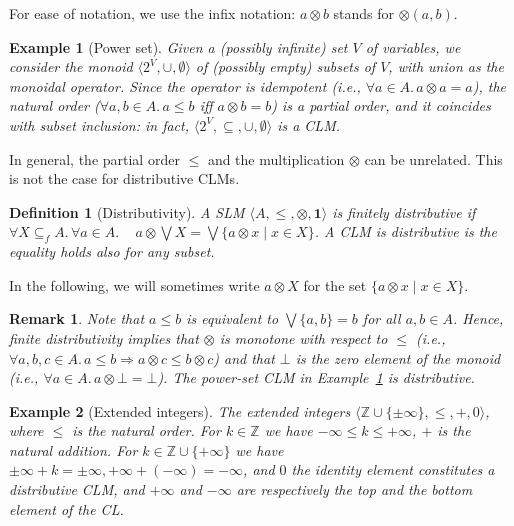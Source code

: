 \documentclass[a4paper]{elsarticle}
\newtheorem{definition}{Definition}
\newtheorem{example}{Example}
\newtheorem{remark}{Remark}
\newcommand{\monop}{\otimes}
\newcommand{\1}{\mathbf{1}}
\begin{document}
For ease of notation, we use the infix notation: $a \monop b$ stands for $\monop(a,b)$.

\begin{example}[Power set]\label{ex:powerset}
	Given a (possibly infinite) set $V$ of variables, we consider
	the monoid $\langle 2^V, \cup, \emptyset \rangle$
	of (possibly empty) subsets of $V$, with union as the monoidal operator.
	Since the operator is idempotent (i.e., $\forall a\in A.\, a \monop a = a$), 
	the natural order ($\forall a, b \in A.\, a \leq b$ iff $a \monop b = b$) 
	is a partial order, and 
	it coincides with subset inclusion:
	in fact, $\langle 2^V, \subseteq, \cup, \emptyset \rangle$
	is a CLM.
\end{example}

In general, the partial order $\leq$ and the multiplication $\otimes$ can be unrelated.
This is not the case for distributive CLMs.

\begin{definition}[Distributivity]
	\label{dist}
	A SLM $\langle A, \leq, \monop, \1 \rangle$ is finitely distributive if
	$\forall X \subseteq_f A.\, \forall a \in A.\, \quad a \monop  \bigvee X = \bigvee \{a \monop x \mid x \in X\}$.
	A CLM is distributive is the equality holds also for any subset.
\end{definition}

In the following, we will sometimes write $a \otimes X$ for the set  $\{a \monop x \mid x \in X\}$.

\begin{remark}
	Note that $a \leq b$ is equivalent to $\bigvee \{a,b\} = b$ for all $a, b \in A$.
	Hence, finite distributivity implies that $\otimes$ is monotone with respect to $\leq$ 
	(i.e., $\forall a, b, c \in A.\, a \leq b \Rightarrow a \otimes c \leq  b \otimes c$)
	and that $\bot$ is the zero element
	of the monoid (i.e., $\forall a \in A.\, a\otimes  \bot = \bot$).
	The power-set CLM in Example~\ref{ex:powerset} is distributive.
\end{remark}

\begin{example}[Extended integers]\label{ex:bipolar}
	The extended integers $\langle \mathbb{Z} \cup \{\pm \infty\}, \leq, +, 0 \rangle$, where 
	$\leq$ is the natural order. For $k \in \mathbb{Z}$ we have $-\infty \leq k \leq +\infty$, $+$ is the natural addition. For $k \in \mathbb{Z} \cup \{+\infty\}$ we have $\pm\infty + k = \pm \infty, +\infty + (-\infty) = -\infty$,
	and $0$ the identity element constitutes a distributive CLM,
	and $+\infty$ and $-\infty$ are respectively the top and the bottom 
	element of the CL.
\end{example}
\end{document}
